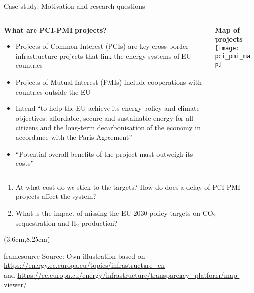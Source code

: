 \documentclass[10pt,aspectratio=169,dvipsnames]{beamer}
\newcommand{\source}[1]{\begin{textblock*}{10cm}(3.6cm,8.25cm)
    \begin{beamercolorbox}[ht=0.5cm,right]{framesource}
        \usebeamerfont{framesource}\usebeamercolor[fg]{framesource} Source: {#1}
    \end{beamercolorbox}
\end{textblock*}}
\begin{document}
\begin{frame}{Case study: Motivation and research questions}
  \footnotesize

  \begin{columns}[T] %
    \begin{column}{.62\textwidth}
        \begin{minipage}[t][.45\textheight]{\linewidth}
            \begin{alertblock}{\textbf{What are PCI-PMI projects?}}
                \begin{itemize}
                  \item Projects of Common Interest (PCIs) are key cross-border infrastructure projects that link the energy systems of EU countries
                  \item Projects of Mutual Interest (PMIs) include cooperations with countries outside the EU
                  \item Intend ``to help the EU achieve its energy policy and climate objectives: affordable, secure and sustainable energy for all citizens and the long-term decarbonisation of the economy in accordance with the Paris Agreement''
                  \item ``Potential overall benefits of the project must outweigh its costs''
                \end{itemize}
            \end{alertblock}
        \end{minipage}
    \end{column}
    
    \begin{column}{.38\textwidth}
        \begin{minipage}[t][.45\textheight]{\linewidth}
            \begin{alertblock}{\textbf{Map of projects}}
              \centering
              \texttt{[image: pci\_pmi\_map]}
            \end{alertblock}
        \end{minipage}
    \end{column}

  \end{columns}

  \vspace{2cm}

  \begin{enumerate}
    \item At \alert{what cost} do we stick to the targets? How do does a \alert{delay of PCI-PMI projects} affect the system?
    \item What is the \alert{impact} of \alert{missing} the EU 2030 policy targets on \alert{CO$_2$ sequestration} and \alert{H$_2$ production}?
  \end{enumerate}

  \source{Own illustration based on \url{https://energy.ec.europa.eu/topics/infrastructure_en} \\ and \url{https://ec.europa.eu/energy/infrastructure/transparency_platform/map-viewer/}}

\end{frame}
\end{document}
